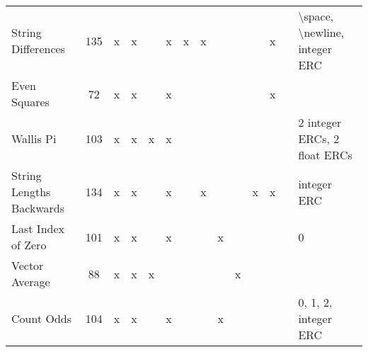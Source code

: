 \documentclass{sig-alternate}
\begin{document}
\begin{table*}
\begin{tabular}{>{\raggedright}p{3.1cm}cccccccccccc>{\raggedright}p{5.5cm}}
String Differences         & 135             & x    & x       &       & x       & x    & x      &                    &                  &                   & x     &            & \textbackslash space, \textbackslash newline, integer ERC                                                                                                                                                                   \tabularnewline
Even Squares               & 72              & x    & x       &       & x       &      &        &                    &                  &                   & x     &            &                                                                                                                                                                                                                             \tabularnewline
Wallis Pi                  & 103             & x    & x       & x     & x       &      &        &                    &                  &                   &       &            & 2 integer ERCs, 2 float ERCs                                                                                                                                                                                                \tabularnewline
String Lengths Backwards   & 134             & x    & x       &       & x       &      & x      &                    &                  & x                 & x     &            & integer ERC                                                                                                                                                                                                                 \tabularnewline
Last Index of Zero         & 101             & x    & x       &       & x       &      &        & x                  &                  &                   &       &            & 0                                                                                                                                                                                                                           \tabularnewline
Vector Average             & 88              & x    & x       & x     &         &      &        &                    & x                &                   &       &            &                                                                                                                                                                                                                             \tabularnewline
Count Odds                 & 104             & x    & x       &       & x       &      &        & x                  &                  &                   &       &            & 0, 1, 2, integer ERC                                                                                                                                                                                                        \tabularnewline

\end{tabular}
\end{table*}
\end{document}
